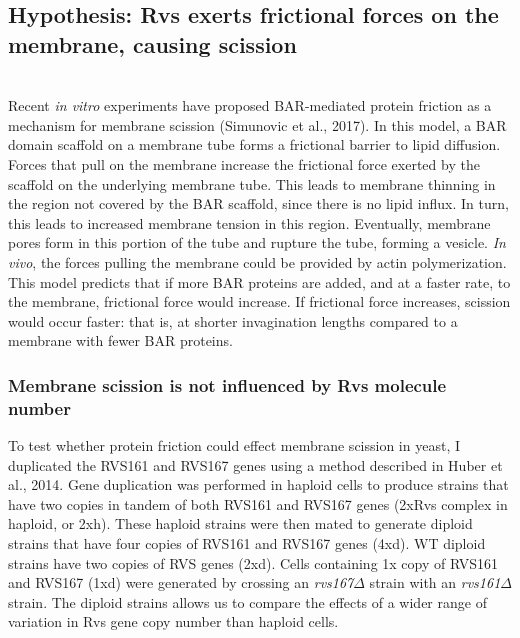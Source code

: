 	\vspace{5mm}




\newpage

\subsection{Hypothesis: Rvs exerts frictional forces on the membrane, causing scission}
\label{friction_model}
				\mbox{}\\
Recent \textit{in vitro} experiments have proposed BAR-mediated protein friction as a mechanism for membrane scission (Simunovic et al., 2017). In this model, a BAR domain scaffold on a membrane tube forms a frictional barrier to lipid diffusion. Forces that pull on the membrane increase the frictional force exerted by the scaffold on the underlying membrane tube. This leads to membrane thinning in the region not covered by the BAR scaffold, since there is no lipid influx. In turn, this leads to increased membrane tension in this region. Eventually, membrane pores form in this portion of the tube and rupture the tube, forming a vesicle. \textit{In vivo}, the forces pulling the membrane could be provided by actin polymerization.
This model predicts that if more BAR proteins are added, and at a faster rate, to the membrane, frictional force would increase. If frictional force increases, scission would occur faster: that is, at shorter invagination lengths compared to a membrane with fewer BAR proteins. 


	\subsubsection{Membrane scission is not influenced by Rvs molecule number}
To test whether protein friction could effect membrane scission in yeast, I duplicated the RVS161 and RVS167 genes using a method described in Huber et al., 2014. Gene duplication was performed in haploid cells to produce strains that have two copies in tandem of both RVS161 and RVS167 genes  (2xRvs complex in haploid, or 2xh). These haploid strains were then mated to generate diploid strains that have four copies of RVS161 and RVS167 genes (4xd). WT diploid strains have two copies of RVS genes (2xd). Cells containing 1x copy of RVS161 and RVS167 (1xd) were generated by crossing an \textit{rvs167$\Delta$}
 strain with an \textit{rvs161$\Delta$} strain. The diploid strains allows us to compare the effects of a wider range of variation in Rvs gene copy number than haploid cells. 



